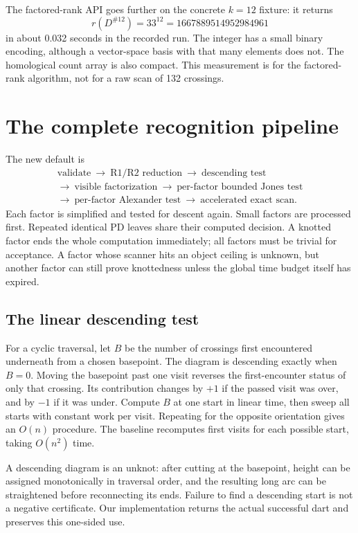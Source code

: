 \documentclass[11pt]{article}
\theoremstyle{definition}\newtheorem{definition}[theorem]{Definition}
\theoremstyle{remark}\newtheorem{remark}[theorem]{Remark}
\begin{document}
The factored-rank API goes further on the concrete $k=12$ fixture: it returns
\[
 r(D^{\#12})=33^{12}=1667889514952984961
\]
in about 0.032 seconds in the recorded run. The integer has a small binary
encoding, although a vector-space basis with that many elements does not.
The homological count array is also compact. This measurement is for the
factored-rank algorithm, not for a raw scan of 132 crossings.

\section{The complete recognition pipeline}
\label{sec:pipeline}

The new default is
\[
\begin{gathered}
\text{validate}\ \longrightarrow\ \text{R1/R2 reduction}
\ \longrightarrow\ \text{descending test}\\
\longrightarrow\ \text{visible factorization}
\ \longrightarrow\ \text{per-factor bounded Jones test}\\
\longrightarrow\ \text{per-factor Alexander test}
\ \longrightarrow\ \text{accelerated exact scan}.
\end{gathered}
\]
Each factor is simplified and tested for descent again. Small factors are
processed first. Repeated identical PD leaves share their computed decision.
A knotted factor ends the whole computation immediately; all factors must
be trivial for acceptance. A factor whose scanner hits an object ceiling is
unknown, but another factor can still prove knottedness unless the global
time budget itself has expired.

\subsection{The linear descending test}

For a cyclic traversal, let $B$ be the number of crossings first encountered
underneath from a chosen basepoint. The diagram is descending exactly when
$B=0$. Moving the basepoint past one visit reverses the first-encounter status
of only that crossing. Its contribution changes by $+1$ if the passed visit
was over, and by $-1$ if it was under. Compute $B$ at one start in linear time,
then sweep all starts with constant work per visit. Repeating for the opposite
orientation gives an $O(n)$ procedure. The baseline recomputes first visits
for each possible start, taking $O(n^2)$ time.

A descending diagram is an unknot: after cutting at the basepoint, height can
be assigned monotonically in traversal order, and the resulting long arc can
be straightened before reconnecting its ends. Failure to find a descending
start is not a negative certificate. Our implementation returns the actual
successful dart and preserves this one-sided use.
\end{document}
